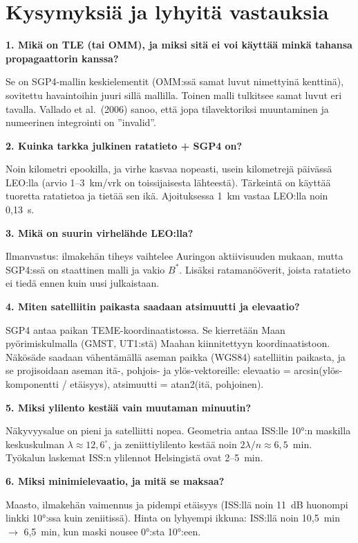 \documentclass[a4paper,11pt]{article}
\begin{document}
\section{Kysymyksiä ja lyhyitä vastauksia}

\newcommand{\kysymys}[1]{\par\medskip\noindent\textbf{#1}\par\nopagebreak}

\kysymys{1. Mikä on TLE (tai OMM), ja miksi sitä ei voi käyttää minkä tahansa propagaattorin kanssa?}
Se on SGP4-mallin keskielementit (OMM:ssä samat luvut nimettyinä kenttinä), sovitettu havaintoihin juuri sillä mallilla. Toinen malli tulkitsee samat luvut eri tavalla. Vallado et al.\ (2006) sanoo, että jopa tilavektoriksi muuntaminen ja numeerinen integrointi on ”invalid”.

\kysymys{2. Kuinka tarkka julkinen ratatieto + SGP4 on?}
Noin kilometri epookilla, ja virhe kasvaa nopeasti, usein kilometrejä päivässä LEO:lla (arvio 1–3~km/vrk on toissijaisesta lähteestä). Tärkeintä on käyttää tuoretta ratatietoa ja tietää sen ikä. Ajoituksessa 1~km vastaa LEO:lla noin 0,13~s.

\kysymys{3. Mikä on suurin virhelähde LEO:lla?}
Ilmanvastus: ilmakehän tiheys vaihtelee Auringon aktiivisuuden mukaan, mutta SGP4:ssä on staattinen malli ja vakio $B^*$. Lisäksi ratamanööverit, joista ratatieto ei tiedä ennen kuin uusi julkaistaan.

\kysymys{4. Miten satelliitin paikasta saadaan atsimuutti ja elevaatio?}
SGP4 antaa paikan TEME-koordinaatistossa. Se kierretään Maan pyörimiskulmalla (GMST, UT1:stä) Maahan kiinnitettyyn koordinaatistoon. Näkösäde saadaan vähentämällä aseman paikka (WGS84) satelliitin paikasta, ja se projisoidaan aseman itä-, pohjois- ja ylös-vektoreille: elevaatio = arcsin(ylös-komponentti / etäisyys), atsimuutti = atan2(itä, pohjoinen).

\kysymys{5. Miksi ylilento kestää vain muutaman minuutin?}
Näkyvyysalue on pieni ja satelliitti nopea. Geometria antaa ISS:lle 10°:n maskilla keskuskulman $\lambda \approx 12,6^\circ$, ja zeniittiylilento kestää noin $2\lambda/n \approx 6,5$~min. Työkalun laskemat ISS:n ylilennot Helsingistä ovat 2–5~min.

\kysymys{6. Miksi minimielevaatio, ja mitä se maksaa?}
Maasto, ilmakehän vaimennus ja pidempi etäisyys (ISS:llä noin 11~dB huonompi linkki 10°:ssa kuin zeniitissä). Hinta on lyhyempi ikkuna: ISS:llä noin 10,5~min $\to$ 6,5~min, kun maski nousee 0°:sta 10°:een.
\end{document}
